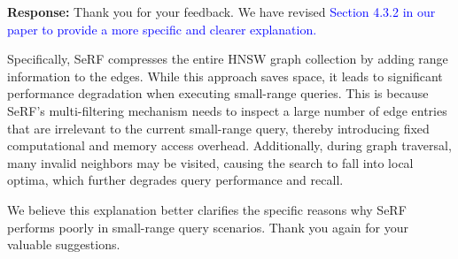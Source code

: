 \documentclass[sigconf, nonacm]{acmart}
\begin{document}
\noindent
\textbf{Response:} Thank you for your feedback. We have revised \textcolor{blue}{Section 4.3.2 in our paper to provide a more specific and clearer explanation.}

Specifically, SeRF compresses the entire HNSW graph collection by adding range information to the edges. While this approach saves space, it leads to significant performance degradation when executing small-range queries. This is because SeRF’s multi-filtering mechanism needs to inspect a large number of edge entries that are irrelevant to the current small-range query, thereby introducing fixed computational and memory access overhead. Additionally, during graph traversal, many invalid neighbors may be visited, causing the search to fall into local optima, which further degrades query performance and recall.

We believe this explanation better clarifies the specific reasons why SeRF performs poorly in small-range query scenarios. Thank you again for your valuable suggestions.


\balance
%
%
\end{document}
